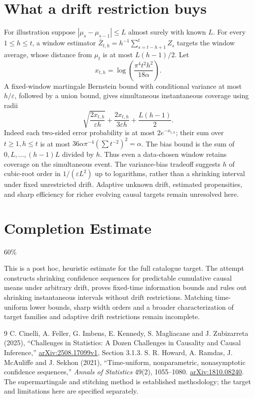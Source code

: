 \documentclass[11pt,a4paper]{article}
\theoremstyle{remark}
\begin{document}
\section{What a drift restriction buys}
For illustration suppose $|\mu_s-\mu_{s-1}|\le L$ almost surely with known $L$. For every $1\le h\le t$, a window estimator $\bar Z_{t,h}=h^{-1}\sum_{s=t-h+1}^t Z_s$ targets the window average, whose distance from $\mu_t$ is at most $L(h-1)/2$. Let
\[
 x_{t,h}=\log\left(\frac{\pi^4t^2h^2}{18\alpha}\right).
\]
A fixed-window martingale Bernstein bound with conditional variance at most $h/\varepsilon$, followed by a union bound, gives simultaneous instantaneous coverage using radii
\[
 \sqrt{\frac{2x_{t,h}}{\varepsilon h}}+
 \frac{2x_{t,h}}{3\varepsilon h}+\frac{L(h-1)}2.
\]
Indeed each two-sided error probability is at most $2e^{-x_{t,h}}$; their sum over $t\ge1,h\le t$ is at most $36\alpha\pi^{-4}(\sum t^{-2})^2=\alpha$. The bias bound is the sum of $0,L,\ldots,(h-1)L$ divided by $h$. Thus even a data-chosen window retains coverage on the simultaneous event. The variance-bias tradeoff suggests $h$ of cubic-root order in $1/(\varepsilon L^2)$ up to logarithms, rather than a shrinking interval under fixed unrestricted drift. Adaptive unknown drift, estimated propensities, and sharp efficiency for richer evolving causal targets remain unresolved here.

\section{Completion Estimate}
60\%

This is a post hoc, heuristic estimate for the full catalogue target.
The attempt constructs shrinking confidence sequences for predictable cumulative causal means under arbitrary drift, proves fixed-time information bounds and rules out shrinking instantaneous intervals without drift restrictions. Matching time-uniform lower bounds, sharp width orders and a broader characterization of target families and adaptive drift restrictions remain incomplete.

\begin{thebibliography}{9}
 C. Cinelli, A. Feller, G. Imbens, E. Kennedy, S. Magliacane and J. Zubizarreta (2025), ``Challenges in Statistics: A Dozen Challenges in Causality and Causal Inference,'' \href{https://arxiv.org/abs/2508.17099v1}{arXiv:2508.17099v1}, Section 3.1.3.
 S. R. Howard, A. Ramdas, J. McAuliffe and J. Sekhon (2021), ``Time-uniform, nonparametric, nonasymptotic confidence sequences,'' \emph{Annals of Statistics} 49(2), 1055--1080. \href{https://arxiv.org/abs/1810.08240}{arXiv:1810.08240}. The supermartingale and stitching method is established methodology; the target and limitations here are specified separately.
\end{thebibliography}
\end{document}
